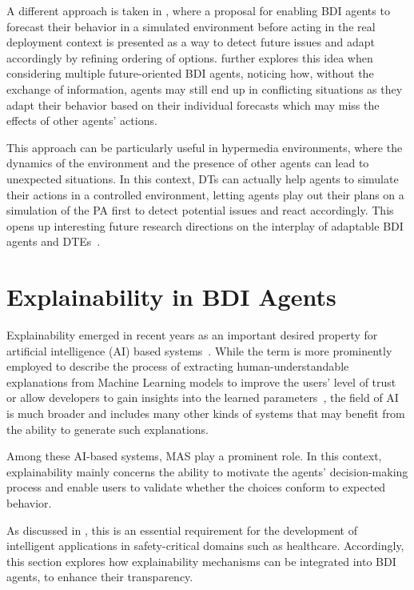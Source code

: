 A different approach is taken in \cite{DBLP:journals/aamas/HubnerBRM25}, 
where a proposal for enabling \ac{BDI} agents to forecast their behavior in a simulated environment before acting in the real deployment context is presented as a way to detect future issues and adapt accordingly by refining ordering of options.
%
\cite{wesaac} further explores this idea when considering multiple future-oriented \ac{BDI} agents, noticing how, without the exchange of information, agents may still end up in conflicting situations as they adapt their behavior based on their individual forecasts which may miss the effects of other agents' actions.

This approach can be particularly useful in hypermedia environments,
where the dynamics of the environment and the presence of other agents can lead to unexpected situations.
%
In this context, \acp{DT} can actually help agents to simulate their actions in a controlled environment, letting agents play out their plans on a simulation of the \ac{PA} first to detect potential issues and react accordingly.
%
This opens up interesting future research directions on the interplay of adaptable \ac{BDI} agents and \acp{DTE}~\cite{DBLP:conf/eumas/Burattini23}.


\section{Explainability in \acs{BDI} Agents}

Explainability emerged in recent years as an important desired property for artificial intelligence (AI) based systems~\cite{xu2019explainable}.
%
While the term is more prominently employed to describe the process of extracting human-understandable explanations from Machine Learning models to improve the users' level of trust or allow developers to gain insights into the learned parameters~\cite{barredoarrietaExplainable2020}, the field of AI is much broader and includes many other kinds of systems that may benefit from the ability to generate such explanations.

Among these AI-based systems, \ac{MAS} play a prominent role. 
In this context, explainability mainly concerns the ability to motivate the agents' decision-making process and enable users to validate whether the choices conform to expected behavior.

As discussed in , this is an essential requirement for the development of intelligent applications in safety-critical domains such as healthcare. 
%
Accordingly, this section explores how explainability mechanisms can be integrated into \ac{BDI} agents, to enhance their transparency.

